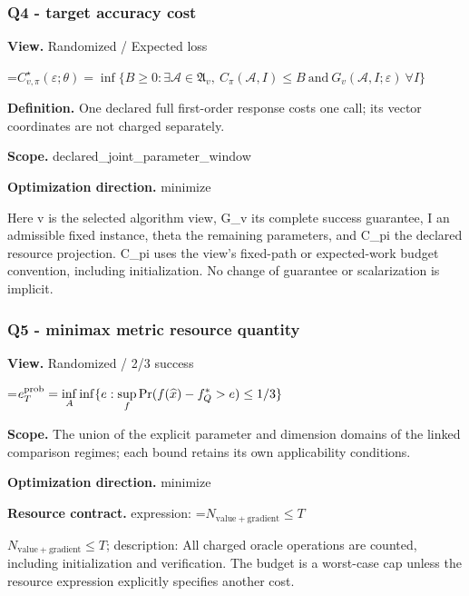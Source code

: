 \documentclass[10pt,a4paper]{article}
\newcommand{\AtlasMath}[1]{\par\begingroup\centering\setbox0=\hbox{$\displaystyle #1$}\ifdim\wd0>1.4\linewidth\typeout{ATLAS WIDE FORMULA: \the\wd0}\fi\ifdim\wd0>\linewidth\resizebox{\linewidth}{!}{\box0}\else\box0\fi\par\endgroup}
\newcommand{\AtlasInlineMath}[1]{\begingroup\setbox0=\hbox{$#1$}\ifdim\wd0>.4\linewidth\endgroup\AtlasMath{#1}\else\endgroup$#1$\fi}
\begin{document}
\subsubsection{Q4 - target accuracy cost}


\textbf{View.} Randomized / Expected loss



\AtlasMath{C^\star_{v,\pi}(\varepsilon;\theta)=\inf\{B\ge0:\exists\mathcal A\in\mathfrak A_v,\ C_\pi(\mathcal A,I)\le B\ \text{and}\ G_v(\mathcal A,I;\varepsilon)\ \forall I\}}


\textbf{Definition.} One declared full first-order response costs one call; its vector coordinates are not charged separately.



\textbf{Scope.} declared\_joint\_parameter\_window



\textbf{Optimization direction.} minimize



Here v is the selected algorithm view, G\_v its complete success guarantee, I an admissible fixed instance, theta the remaining parameters, and C\_pi the declared resource projection. C\_pi uses the view's fixed-path or expected-work budget convention, including initialization. No change of guarantee or scalarization is implicit.



\subsubsection{Q5 - minimax metric resource quantity}


\textbf{View.} Randomized / 2/3 success



\AtlasMath{e_T^{\rm prob}=\inf_A\inf\{e:\sup_f\Pr(f(\widehat x)-f_Q^*>e)\le1/3\}}


\textbf{Scope.} The union of the explicit parameter and dimension domains of the linked comparison regimes; each bound retains its own applicability conditions.



\textbf{Optimization direction.} minimize



\textbf{Resource contract.} expression: \AtlasInlineMath{N_{\mathrm{value+gradient}}\le T}; description: All charged oracle operations are counted, including initialization and verification. The budget is a worst-case cap unless the resource expression explicitly specifies another cost.
\end{document}
